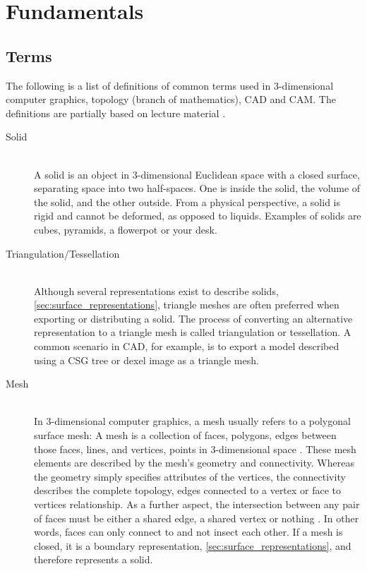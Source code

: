 \chapter{Fundamentals} %
\label{ch:fundamentals}

\section{Terms}
\label{sec:definitions}

The following is a list of definitions of common terms used in 3-dimensional computer graphics, topology (branch of mathematics), CAD and CAM. The definitions are partially based on lecture material \cite{mesh_basics, mesh_lecture10}.

\begin{description}

	\item[Solid] \hfill \\
	A solid is an object in 3-dimensional Euclidean space with a closed surface, separating space into two half-spaces.
	One is inside the solid, the volume of the solid, and the other outside.
	From a physical perspective, a solid is rigid and cannot be deformed, as opposed to \eg liquids.
	Examples of solids are cubes, pyramids, a flowerpot or your desk.


	\item[Triangulation/Tessellation] \hfill \\
	Although several representations exist to describe solids, \cf \cref{sec:surface_representations}, triangle meshes are often preferred when exporting or distributing a solid.
	The process of converting an alternative representation to a triangle mesh is called triangulation or tessellation.
	A common scenario in CAD, for example, is to export a model described using a CSG tree or dexel image as a triangle mesh.




	\item[Mesh] \hfill \\
	In 3-dimensional computer graphics, a mesh usually refers to a polygonal surface mesh:
	A mesh is a collection of faces, \ie polygons, edges between those faces, \ie lines, and vertices, \ie points in 3-dimensional space \cite{mesh_basics}.
	These mesh elements are described by the mesh's geometry and connectivity.
	Whereas the geometry simply specifies attributes of the vertices, the connectivity describes the complete topology, \eg edges connected to a vertex or face to vertices relationship.
	As a further aspect, the intersection between any pair of faces must be either a shared edge, a shared vertex or nothing \cite{mesh_lecture10}.
	In other words, faces can only connect to and not insect each other.
	If a mesh is closed, it is a boundary representation, \cf \cref{sec:surface_representations}, and therefore represents a solid.


\end{description}
